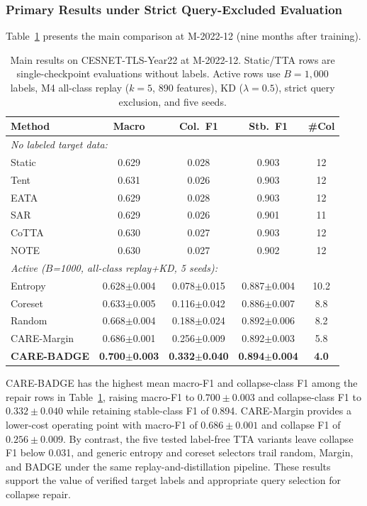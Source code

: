 \documentclass[journal]{IEEEtran}
\newcommand{\ours}{CARE}  %
\begin{document}
\subsubsection{Primary Results under Strict Query-Excluded Evaluation}
\label{sec:primary_results}

Table~\ref{tab:main_results} presents the main comparison at M-2022-12 (nine months after training).

\begin{table}[!htbp]
\centering
\caption{Main results on CESNET-TLS-Year22 at M-2022-12. Static/TTA rows are single-checkpoint evaluations without labels. Active rows use $B{=}1{,}000$ labels, M4 all-class replay ($k{=}5$, 890 features), KD ($\lambda{=}0.5$), strict query exclusion, and five seeds.}
\label{tab:main_results}
\scriptsize
\setlength{\tabcolsep}{3pt}
\begin{tabular}{@{}l cccc@{}}
\toprule
Method & Macro & Col.\ F1 & Stb.\ F1 & \#Col \\
\midrule
\multicolumn{5}{l}{\textit{No labeled target data:}} \\
Static          & 0.629 & 0.028 & 0.903 & 12 \\
Tent            & 0.631 & 0.026 & 0.903 & 12 \\
EATA            & 0.629 & 0.028 & 0.903 & 12 \\
SAR             & 0.629 & 0.026 & 0.901 & 11 \\
CoTTA           & 0.630 & 0.027 & 0.903 & 12 \\
NOTE            & 0.630 & 0.027 & 0.902 & 12 \\
\midrule
\multicolumn{5}{l}{\textit{Active ($B$=1000, all-class replay+KD, 5 seeds):}} \\
Entropy         & 0.628$\pm$0.004 & 0.078$\pm$0.015 & 0.887$\pm$0.004 & 10.2 \\
Coreset         & 0.633$\pm$0.005 & 0.116$\pm$0.042 & 0.886$\pm$0.007 & 8.8 \\
Random          & 0.668$\pm$0.004 & 0.188$\pm$0.024 & 0.892$\pm$0.006 & 8.2 \\
\ours{}-Margin  & 0.686$\pm$0.001 & 0.256$\pm$0.009 & 0.892$\pm$0.003 & 5.8 \\
\textbf{\ours{}-BADGE} & \textbf{0.700$\pm$0.003} & \textbf{0.332$\pm$0.040} & \textbf{0.894$\pm$0.004} & \textbf{4.0} \\
\bottomrule
\end{tabular}
\end{table}

CARE-BADGE has the highest mean macro-F1 and collapse-class F1 among the repair rows in Table~\ref{tab:main_results}, raising macro-F1 to $0.700{\pm}0.003$ and collapse-class F1 to $0.332{\pm}0.040$ while retaining stable-class F1 of 0.894. CARE-Margin provides a lower-cost operating point with macro-F1 of $0.686{\pm}0.001$ and collapse F1 of $0.256{\pm}0.009$. By contrast, the five tested label-free TTA variants leave collapse F1 below 0.031, and generic entropy and coreset selectors trail random, Margin, and BADGE under the same replay-and-distillation pipeline. These results support the value of verified target labels and appropriate query selection for collapse repair.
\end{document}
